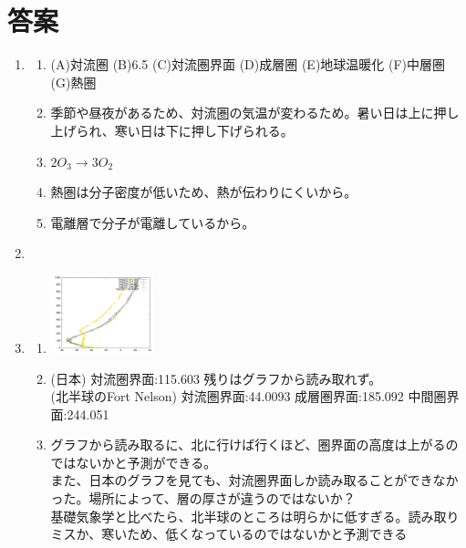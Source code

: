 \documentclass{jsarticle}
\newenvironment{problems}
{
  \renewcommand\labelenumi{\doublebox{\arabic{enumi}}}
  \begin{enumerate}
}{
  \end{enumerate}
  \renewcommand\labelenumi{\arabic{enumi}.}
}
\begin{document}
\section{答案}
\begin{problems}
\item
        \begin{enumerate}[(1)]
        \item
        (A)対流圏
        (B)6.5
        (C)対流圏界面
        (D)成層圏
        (E)地球温暖化
        (F)中層圏
        (G)熱圏
        \item
        季節や昼夜があるため、対流圏の気温が変わるため。暑い日は上に押し上げられ、寒い日は下に押し下げられる。
        \item
        $2O_3 \rightarrow 3O_2$
        \item
        熱圏は分子密度が低いため、熱が伝わりにくいから。
        \item
        電離層で分子が電離しているから。
        \end{enumerate}

\item



\item
        \begin{enumerate}[(1)]
        \item
        \includegraphics[width=3cm]{graph.png}
        \item
        (日本)
        対流圏界面:115.603
        残りはグラフから読み取れず。　\\
        (北半球のFort Nelson)
        対流圏界面:44.0093
        成層圏界面:185.092
        中間圏界面:244.051
        \item
        グラフから読み取るに、北に行けば行くほど、圏界面の高度は上がるのではないかと予測ができる。 \\
        また、日本のグラフを見ても、対流圏界面しか読み取ることができなかった。場所によって、層の厚さが違うのではないか？\\
        基礎気象学と比べたら、北半球のところは明らかに低すぎる。読み取りミスか、寒いため、低くなっているのではないかと予測できる
        \end{enumerate}

\end{problems}
\end{document}
